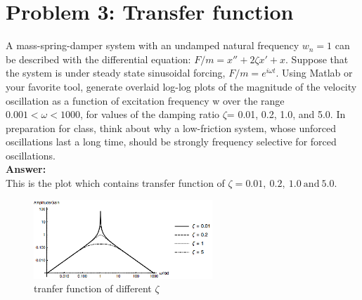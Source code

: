 \documentclass[a4paper]{article}
\begin{document}
\section{Problem 3: Transfer function}
A mass-spring-damper system with an undamped natural frequency $w_n = 1$ can be described with the differential equation:   $F/m = x''+ 2\zeta x' + x$.   Suppose that the system is under steady state sinusoidal forcing,  $F/m=e^{i\omega t}$.  Using Matlab or your favorite tool, generate overlaid log-log plots of the magnitude of the velocity oscillation as a function of excitation frequency w over the range  $0.001< \omega < 1000$,  for values of the damping ratio $\zeta $= 0.01, 0.2, 1.0, and 5.0.
In preparation for class, think about why a low-friction system, whose unforced oscillations last a long time, should be strongly frequency selective for forced oscillations.\\
{\bf Answer: }\\
This is the plot which contains transfer function of  $\zeta = 0.01,\ 0.2,\ 1.0\ \text{and}\ 5.0 $.
\begin{figure}[hbtp]
\centering
\includegraphics[width=0.6\textwidth]{pic/transfer.png}
\caption{tranfer function of different $\zeta$} 
\label{transfer}
\end{figure}
\end{document}
